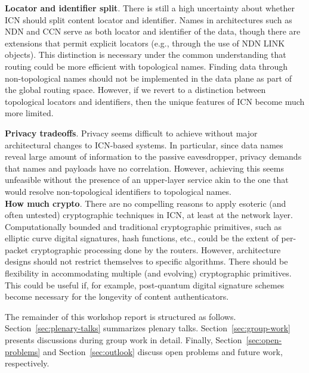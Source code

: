 \documentclass{sig-alternate-10pt}
\begin{document}
\noindent
{\bf Locator and identifier split}. There is still a high uncertainty about whether ICN should split content
locator and identifier. Names in architectures such as NDN and CCN serve as both
locator and identifier of the data, though there are extensions that permit explicit locators
(e.g., through the use of NDN LINK objects). This distinction is necessary under the common understanding that
routing could be more efficient with topological names. Finding
data through non-topological names should not be implemented in the data plane as part of the global
routing space. However, if we revert to a distinction between topological locators and
identifiers, then the unique features of ICN become much more limited.

\noindent
{\bf Privacy tradeoffs}. Privacy seems difficult to achieve without major architectural changes to
ICN-based systems. In particular, since data names reveal large amount of information to
the passive eavesdropper, privacy demands that names and payloads have no correlation.
However, achieving this seems unfeasible without the presence of an upper-layer service
akin to the one that would resolve non-topological identifiers to topological names.\\

\noindent
{\bf How much crypto}. There are no compelling reasons to apply esoteric (and often untested)
cryptographic techniques in ICN, at least at the network layer. Computationally bounded
and traditional cryptographic primitives, such as elliptic curve digital signatures, hash functions, etc.,
could be the extent of per-packet cryptographic processing done by the routers.
However, architecture designs should not restrict themselves
to specific algorithms. There should be flexibility in accommodating
multiple (and evolving) cryptographic primitives. This could be useful if, for example,
post-quantum digital signature schemes become necessary for the longevity of content authenticators.

The remainder of this workshop report is structured as follows.
Section~\ref{sec:plenary-talks} summarizes plenary talks.
Section~\ref{sec:group-work} presents discussions during group work in detail.
Finally, Section~\ref{sec:open-problems} and Section~\ref{sec:outlook} discuss open problems and future work, respectively.
\end{document}
